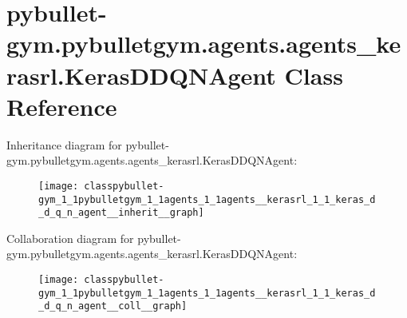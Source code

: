 \hypertarget{classpybullet-gym_1_1pybulletgym_1_1agents_1_1agents__kerasrl_1_1_keras_d_d_q_n_agent}{}\section{pybullet-\/gym.pybulletgym.\+agents.\+agents\+\_\+kerasrl.\+Keras\+D\+D\+Q\+N\+Agent Class Reference}
\label{classpybullet-gym_1_1pybulletgym_1_1agents_1_1agents__kerasrl_1_1_keras_d_d_q_n_agent}


Inheritance diagram for pybullet-\/gym.pybulletgym.\+agents.\+agents\+\_\+kerasrl.\+Keras\+D\+D\+Q\+N\+Agent\+:
\nopagebreak
\begin{figure}[H]
\begin{center}
\leavevmode
\texttt{[image: classpybullet-gym\_1\_1pybulletgym\_1\_1agents\_1\_1agents\_\_kerasrl\_1\_1\_keras\_d\_d\_q\_n\_agent\_\_inherit\_\_graph]}
\end{center}
\end{figure}


Collaboration diagram for pybullet-\/gym.pybulletgym.\+agents.\+agents\+\_\+kerasrl.\+Keras\+D\+D\+Q\+N\+Agent\+:
\nopagebreak
\begin{figure}[H]
\begin{center}
\leavevmode
\texttt{[image: classpybullet-gym\_1\_1pybulletgym\_1\_1agents\_1\_1agents\_\_kerasrl\_1\_1\_keras\_d\_d\_q\_n\_agent\_\_coll\_\_graph]}
\end{center}
\end{figure}
